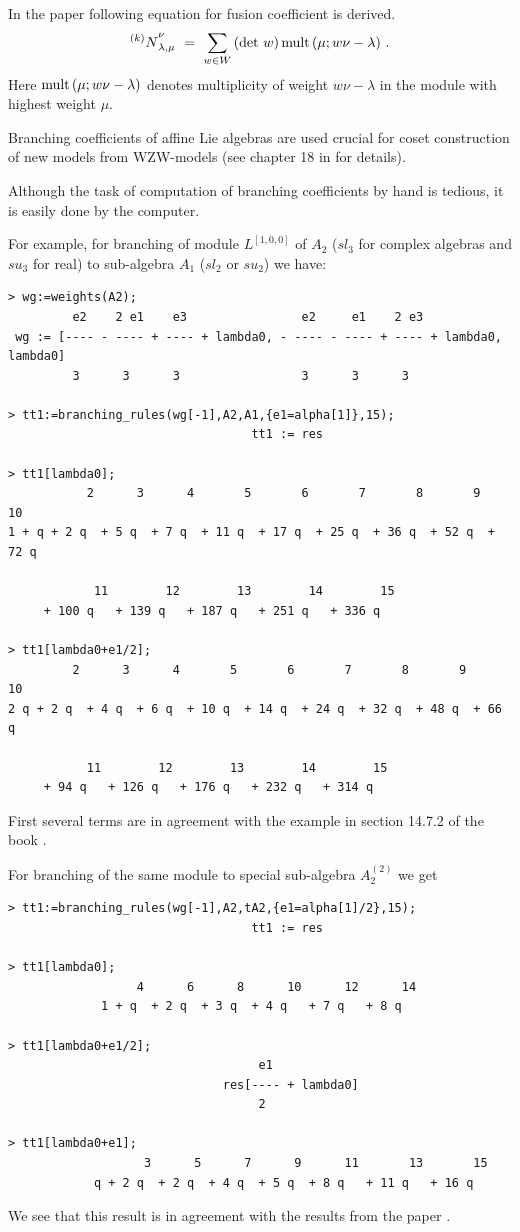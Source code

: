 \documentclass[a4paper,12pt]{article}
\theoremstyle{definition} \newtheorem{Def}{Definition}
\def\la{{\lambda}}\def\al{{\alpha}}\def\be{{\beta}}\def\ga{{\gamma}}
\def\Nk{{{ }^{(k)}N}}\def\Vk{{{ }^{(k)}V}}
\begin{document}
In the paper \cite{Walton:1999xc} following equation for fusion
coefficient is derived.
\begin{equation}
  \label{eq:5}
\Nk_{\la,\mu}^\nu\ =\ \sum_{w\in W}\, (\det\,w)\, 
\mult(\mu; w\nu-\la)\ .
 \end{equation}
Here $\mult(\mu; w\nu-\la)$ denotes multiplicity of weight
$w\nu-\lambda$ in the module with highest weight $\mu$.

Branching coefficients of affine Lie algebras are used
crucial for coset construction of new models from WZW-models (see
chapter 18 in \cite{difrancesco1997cft} for details). 

Although the task of computation of branching coefficients by hand is
tedious, it is easily done by the computer.

For example, for branching of module $L^{[1,0,0]}$ of $A_2$ ($sl_3$
for complex algebras and $su_3$ for real) to sub-algebra $A_1$ ($sl_2$
or $su_2$) we have:
\begin{verbatim}
> wg:=weights(A2);
         e2    2 e1    e3                e2     e1    2 e3
 wg := [---- - ---- + ---- + lambda0, - ---- - ---- + ---- + lambda0, lambda0]
         3      3      3                 3      3      3

> tt1:=branching_rules(wg[-1],A2,A1,{e1=alpha[1]},15);
                                  tt1 := res

> tt1[lambda0];
           2      3      4       5       6       7       8       9       10
1 + q + 2 q  + 5 q  + 7 q  + 11 q  + 17 q  + 25 q  + 36 q  + 52 q  + 72 q

            11        12        13        14        15
     + 100 q   + 139 q   + 187 q   + 251 q   + 336 q  

> tt1[lambda0+e1/2];
         2      3      4       5       6       7       8       9       10
2 q + 2 q  + 4 q  + 6 q  + 10 q  + 14 q  + 24 q  + 32 q  + 48 q  + 66 q

           11        12        13        14        15
     + 94 q   + 126 q   + 176 q   + 232 q   + 314 q  
\end{verbatim}
First several terms are in agreement with the example in section
14.7.2 of the book \cite{difrancesco1997cft}.

For branching of the same module to special sub-algebra $A_2^{(2)}$ we
get
\begin{verbatim}
> tt1:=branching_rules(wg[-1],A2,tA2,{e1=alpha[1]/2},15);
                                  tt1 := res

> tt1[lambda0];
                  4      6      8      10      12      14
             1 + q  + 2 q  + 3 q  + 4 q   + 7 q   + 8 q

> tt1[lambda0+e1/2];
                                   e1
                              res[---- + lambda0]
                                   2

> tt1[lambda0+e1];
                   3      5      7      9      11       13       15
            q + 2 q  + 2 q  + 4 q  + 5 q  + 8 q   + 11 q   + 16 q
\end{verbatim}
We see that this result is in agreement with the results from the paper \cite{ilyin812pbc}.
\end{document}
